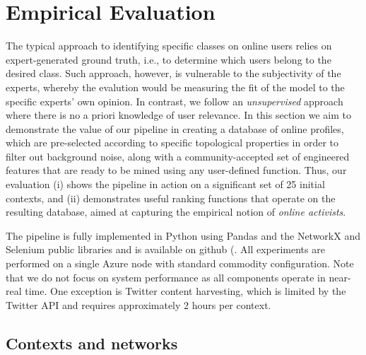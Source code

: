 \section{Empirical Evaluation} \label{sec:evaluation}

The typical approach to identifying specific classes on online users relies on expert-generated ground truth, i.e., to determine which users belong to the desired class. 
Such approach, however, is vulnerable to  the subjectivity of the experts, whereby the evalution would  be measuring the fit of the model to the specific experts' own opinion. 
In contrast, we follow an \textit{unsupervised} approach where there is no a priori knowledge of user relevance.  
In this section we aim to demonstrate the value of our pipeline in creating a database of online profiles, which are pre-selected according to specific topological properties in order to filter out background noise,  along with a community-accepted set of engineered features that are ready to be mined using any user-defined function.
%
Thus, our evaluation (i) shows the pipeline in action on a significant set of 25 initial contexts, and (ii) demonstrates useful ranking functions that operate on the resulting database, aimed at capturing the empirical notion of  \textit{online activists}.

The pipeline is fully implemented in Python using Pandas and the NetworkX and Selenium public libraries and is available on github (. 
All experiments are performed on a single Azure node with standard commodity configuration.
Note that we do not focus on system performance as all components operate in near-real time. One exception is  Twitter content harvesting, which is limited by the Twitter API and requires approximately 2 hours per context.

\subsection{Contexts and networks} \label{sec:contexts}
 
